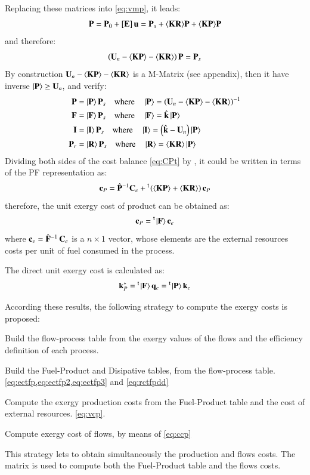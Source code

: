 \documentclass{ecos2018}
\begin{document}
Replacing these matrices into \cref{eq:vmp}, it leads:
\[
\mathbf{P}=\mathbf{P}_0 + \left[ \textbf{E} \right]\mathbf{u} = \mathbf{P}_s + \langle \textbf{KR} \rangle\mathbf{P} + \langle \textbf{KP} \rangle\mathbf{P}
\]
and therefore:
\begin{equation}
\left(\mathbf{U}_n-\langle \textbf{KP} \rangle-\langle \textbf{KR} \rangle\right)\mathbf{P}=\mathbf{P}_s
\end{equation}
By construction $\mathbf{U}_n-\langle \textbf{KP} \rangle-\langle \textbf{KR} \rangle$ is a M-Matrix (see appendix), then it have inverse $\left| {\textbf{P} } \right\rangle\ge \mathbf{U}_n$, and verify:
\begin{align}
\mathbf{P} &= \left| {\textbf{P} } \right\rangle \mathbf{P}_s  \quad \text{where}
\quad \left| {\textbf{P} } \right\rangle =\left( \mathbf{U}_n - \langle \textbf{KP} \rangle -\langle \textbf{KR} \rangle \right)^{-1} \label{eq:mopdp}\\
\mathbf{F} &= \left| {\textbf{F} } \right\rangle \mathbf{P}_s \quad \text{where}
\quad \left| {\textbf{F} } \right\rangle =\hat{\mathbf{k}}\left| {\textbf{P} } \right\rangle \label{eq:mopdf} \\
\mathbf{I} &= \left| {\textbf{I} } \right\rangle \mathbf{P}_s  \quad \text{where}
\quad \left| {\textbf{I} } \right\rangle =\left( \hat{\mathbf{k}} - \mathbf{U}_n \right)\left| {\textbf{P} } \right\rangle  \label{eq:mopdi}\\
\mathbf{P}_r &= \left| {\textbf{R} } \right\rangle \mathbf{P}_s \quad \text{where}
\quad \left| {\textbf{R} } \right\rangle =\langle \textbf{KR} \rangle\left| {\textbf{P} } \right\rangle  \label{eq:mopdr}
\end{align}
Dividing both sides of the cost balance \cref{eq:CPt} by , it could be written in terms of the PF representation as:
\begin{equation}
\mathbf{c}_P = \hat{\mathbf{P}}^{-1} \mathbf{C}_e  + \prescript{\smash{\mathsf{t}}}{}{\mskip-1mu}\left(\langle \textbf{KP} \rangle+\langle \textbf{KR} \rangle\right)  \mathbf{c}_P
\end{equation}
therefore, the unit exergy cost of product can be obtained as:
\begin{equation}
\label{eq:vcp}
\mathbf{c}_P =  \prescript{\smash{\mathsf{t}}}{}{\mskip-1mu}\left| {\textbf{F} } \right\rangle \mathbf{c}_e
\end{equation}
where $\mathbf{c}_e=\hat{\mathbf{F}}^{-1}\,\mathbf{C}_e$ is a $n \times 1$ vector, whose elements are the external resources costs  per unit of fuel consumed in the process.

The direct unit exergy cost is calculated as:
\begin{equation}
\mathbf{k}_{P}^{*}=\prescript{\smash{\mathsf{t}}}{}{\mskip-1mu}\left| {\textbf{F} } \right\rangle\mathbf{q}_e  =  \prescript{\smash{\mathsf{t}}}{}{\mskip-1mu}\left| {\textbf{P} } \right\rangle\mathbf{k}_e
\end{equation}

According these results, the following strategy to compute the exergy costs is proposed:
\begin{compactenum}[(i)]
	\item Build the flow-process table from the exergy values of the flows and the efficiency definition of each process.
	\item Build the Fuel-Product and Disipative tables, from the flow-process table. \cref{eq:ectfp,eq:ectfp2,eq:ectfp3} and \cref{eq:rctfpdd}
	\item Compute the exergy production costs from the Fuel-Product table and the cost of external resources. \cref{eq:vcp}.
	\item Compute exergy cost of flows, by means of \cref{eq:ccp}
\end{compactenum}
This strategy lets to obtain simultaneously the production and flows costs. The matrix  is used to compute both the Fuel-Product table and the flows costs.
\end{document}
